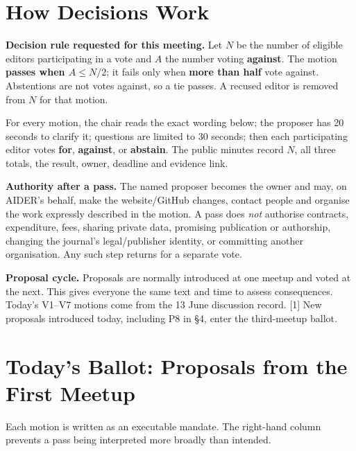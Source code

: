 \documentclass[11pt]{article}
\newcommand{\src}[1]{{\footnotesize\color{ink3}[#1]}}
\begin{document}
\section{How Decisions Work}

\begin{takeaway}
\textbf{Decision rule requested for this meeting.} Let $N$ be the number of eligible editors participating in a vote and $A$ the number voting \textbf{against}. The motion \textbf{passes when $A\leq N/2$}; it fails only when \textbf{more than half} vote against. Abstentions are not votes against, so a tie passes. A recused editor is removed from $N$ for that motion.
\end{takeaway}

For every motion, the chair reads the exact wording below; the proposer has 20 seconds to clarify it; questions are limited to 30 seconds; then each participating editor votes \textbf{for}, \textbf{against}, or \textbf{abstain}. The public minutes record $N$, all three totals, the result, owner, deadline and evidence link.

\textbf{Authority after a pass.} The named proposer becomes the owner and may, on AIDER's behalf, make the website/GitHub changes, contact people and organise the work expressly described in the motion. A pass does \emph{not} authorise contracts, expenditure, fees, sharing private data, promising publication or authorship, changing the journal's legal/publisher identity, or committing another organisation. Any such step returns for a separate vote.

\textbf{Proposal cycle.} Proposals are normally introduced at one meetup and voted at the next. This gives everyone the same text and time to assess consequences. Today's V1--V7 motions come from the 13 June discussion record. \src{1} New proposals introduced today, including P8 in \S4, enter the third-meetup ballot.

\section{Today's Ballot: Proposals from the First Meetup}

Each motion is written as an executable mandate. The right-hand column prevents a pass being interpreted more broadly than intended.
\end{document}
